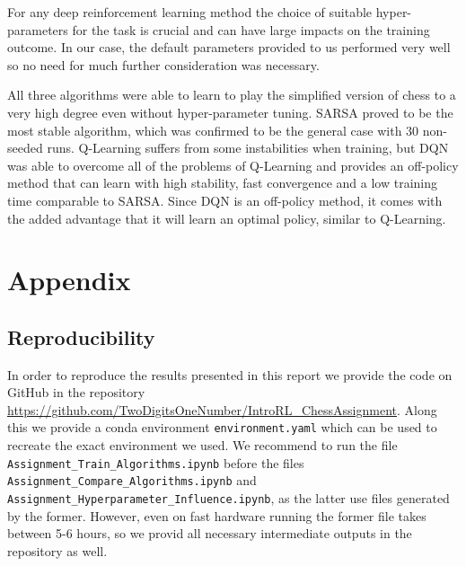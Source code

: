 \documentclass[conference]{IEEEtran}
\begin{document}
For any deep reinforcement learning method the choice of suitable hyper-parameters for the task is crucial and can have large impacts on the training outcome. In our case, the default parameters provided to us performed very well so no need for much further consideration was necessary.

All three algorithms were able to learn to play the simplified version of chess to a very high degree even without hyper-parameter tuning. SARSA proved to be the most stable algorithm, which was confirmed to be the general case with 30 non-seeded runs. Q-Learning suffers from some instabilities when training, but DQN was able to overcome all of the problems of Q-Learning and provides an off-policy method that can learn with high stability, fast convergence and a low training time comparable to SARSA. Since DQN is an off-policy method, it comes with the added advantage that it will learn an optimal policy, similar to Q-Learning.











\section{Appendix}


\subsection{Reproducibility}\label{sec:reproducibility}

In order to reproduce the results presented in this report we provide the code on GitHub in the repository \href{https://github.com/TwoDigitsOneNumber/IntroRL\_ChessAssignment}{https://github.com/TwoDigitsOneNumber/IntroRL\_ChessAssignment}. Along this we provide a conda environment \verb"environment.yaml" which can be used to recreate the exact environment we used. We recommend to run the file \verb"Assignment_Train_Algorithms.ipynb" before the files \verb"Assignment_Compare_Algorithms.ipynb" and \verb"Assignment_Hyperparameter_Influence.ipynb", as the latter use files generated by the former. However, even on fast hardware running the former file takes between 5-6 hours, so we provid all necessary intermediate outputs in the repository as well.
\end{document}
